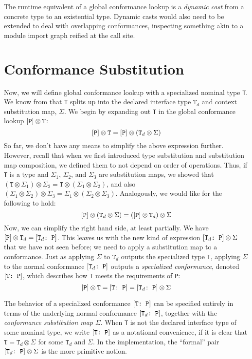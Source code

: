 \documentclass[../generics]{subfiles}
\begin{document}
The runtime equivalent of a global conformance lookup is a \emph{dynamic cast} from a concrete type to an existential type. Dynamic casts would also need to be extended to deal with overlapping conformances, inspecting something akin to a module import graph reified at the call site.

\section{Conformance Substitution}\label{conformance subst}

Now, we will define global conformance lookup with a specialized nominal type \texttt{T}. We know from  that \texttt{T} splits up into the declared interface type $\texttt{T}_d$ and context substitution map, $\Sigma$. We begin by expanding out \texttt{T} in the global conformance lookup $[\texttt{P}]\otimes\texttt{T}$:
\[
[\texttt{P}]\otimes\texttt{T} = [\texttt{P}] \otimes (\texttt{T}_d \otimes \Sigma)
\]
So far, we don't have any means to simplify the above expression further. However, recall that when we first introduced type substitution and substitution map composition, we defined them to not depend on order of operations. Thus, if \texttt{T} is a type and $\Sigma_1$, $\Sigma_2$, and $\Sigma_3$ are substitution maps, we showed that $(\texttt{T}\otimes\Sigma_1)\otimes\Sigma_2=\texttt{T}\otimes(\Sigma_1\otimes\Sigma_2)$, and also $(\Sigma_1\otimes\Sigma_2)\otimes\Sigma_3=\Sigma_1\otimes(\Sigma_2\otimes\Sigma_3)$. Analogously, we would like for the following to hold:
\[
[\texttt{P}] \otimes (\texttt{T}_d \otimes \Sigma) = ([\texttt{P}] \otimes \texttt{T}_d) \otimes \Sigma
\]
Now, we can simplify the right hand side, at least partially. We have $[\texttt{P}]\otimes\texttt{T}_d=[\texttt{$\texttt{T}_d$:~P}]$. This leaves us with the new kind of expression $[\texttt{$\texttt{T}_d$:~P}]\otimes\Sigma$ that we have not seen before; we need to apply a substitution map to a conformance. Just as applying $\Sigma$ to $\texttt{T}_d$ outputs the specialized type \texttt{T}, applying $\Sigma$ to the normal conformance $[\texttt{$\texttt{T}_d$:~P}]$ outputs a \emph{specialized conformance}, denoted $[\texttt{T:~P}]$, which describes how \texttt{T} meets the requirements of \texttt{P}:
\[[\texttt{P}]\otimes\texttt{T}=[\texttt{T:~P}]=[\texttt{$\texttt{T}_d$:~P}]\otimes\Sigma\]

The behavior of a specialized conformance $[\texttt{T:~P}]$ can be specified entirely in terms of the underlying normal conformance $[\texttt{$\texttt{T}_d$:~P}]$, together with the \emph{conformance substitution map} $\Sigma$. When \texttt{T} is not the declared interface type of some nominal type, we write $[\texttt{T:~P}]$ as a notational convenience, if it is clear that $\texttt{T}=\texttt{T}_d\otimes\Sigma$ for some $\texttt{T}_d$ and $\Sigma$. In the implementation, the ``formal'' pair $[\texttt{$\texttt{T}_d$:~P}]\otimes\Sigma$ is the more primitive notion.
\end{document}
